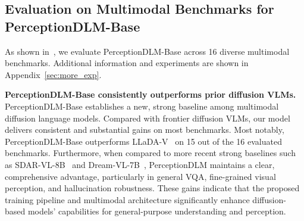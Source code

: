 \documentclass{llmxive}
\begin{document}
\vspace{-2mm}
\subsection{Evaluation on Multimodal Benchmarks for PerceptionDLM-Base}
\vspace{-2mm}
As shown in~, we evaluate PerceptionDLM-Base across 16 diverse multimodal benchmarks. Additional information and experiments are shown in Appendix~\ref{sec:more_exp}.

\noindent
\textbf{PerceptionDLM-Base consistently outperforms prior diffusion VLMs.}
PerceptionDLM-Base establishes a new, strong baseline among multimodal diffusion language models. Compared with frontier diffusion VLMs, our model delivers consistent and substantial gains on most benchmarks. Most notably, PerceptionDLM-Base outperforms LLaDA-V~\citep{you2025llada} on 15 out of the 16 evaluated benchmarks. Furthermore, when compared to more recent strong baselines such as SDAR-VL-8B~\citep{cheng2025sdar} and Dream-VL-7B~\citep{ye2025dream}, PerceptionDLM maintains a clear, comprehensive advantage, particularly in general VQA, fine-grained visual perception, and hallucination robustness.
%
These gains indicate that the proposed training pipeline and multimodal architecture significantly enhance diffusion-based models' capabilities for general-purpose understanding and perception.
\end{document}
